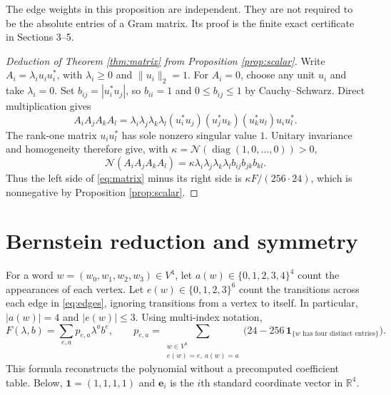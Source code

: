 \documentclass[11pt,letterpaper]{article}
\newcommand{\N}{\mathcal N}
\newcommand{\R}{\mathbb R}
\newcommand{\one}{\boldsymbol{1}}
\begin{document}
The edge weights in this proposition are independent. They are not required to be the absolute entries of a Gram matrix. Its proof is the finite exact certificate in Sections 3--5.

\begin{proof}[Deduction of Theorem \ref{thm:matrix} from Proposition \ref{prop:scalar}]
Write $A_i=\lambda_i u_i u_i^*$, with $\lambda_i\ge0$ and $\|u_i\|_2=1$. For $A_i=0$, choose any unit $u_i$ and take $\lambda_i=0$. Set $b_{ij}=|u_i^*u_j|$, so $b_{ii}=1$ and $0\le b_{ij}\le1$ by Cauchy--Schwarz. Direct multiplication gives
\[
A_iA_jA_kA_l=\lambda_i\lambda_j\lambda_k\lambda_l
 (u_i^*u_j)(u_j^*u_k)(u_k^*u_l)u_i u_l^*.
\]
The rank-one matrix $u_i u_l^*$ has sole nonzero singular value $1$. Unitary invariance and homogeneity therefore give, with $\kappa=\N(\operatorname{diag}(1,0,\ldots,0))>0$,
\begin{equation}\label{eq:reduction}
\N(A_iA_jA_kA_l)=\kappa\lambda_i\lambda_j\lambda_k\lambda_l b_{ij}b_{jk}b_{kl}.
\end{equation}
Thus the left side of \eqref{eq:matrix} minus its right side is $\kappa F/(256\cdot24)$, which is nonnegative by Proposition \ref{prop:scalar}.
\end{proof}

\section{Bernstein reduction and symmetry}
For a word $w=(w_0,w_1,w_2,w_3)\in V^4$, let $a(w)\in\{0,1,2,3,4\}^4$ count the appearances of each vertex. Let $e(w)\in\{0,1,2,3\}^6$ count the transitions across each edge in \eqref{eq:edges}, ignoring transitions from a vertex to itself. In particular, $|a(w)|=4$ and $|e(w)|\le3$. Using multi-index notation,
\begin{equation}\label{eq:power}
F(\lambda,b)=\sum_{e,a}p_{e,a}\lambda^a b^e,\qquad
p_{e,a}=\sum_{\substack{w\in V^4\\e(w)=e,\ a(w)=a}}
\bigl(24-256\,\mathbf1_{\{w\text{ has four distinct entries}\}}\bigr).
\end{equation}
This formula reconstructs the polynomial without a precomputed coefficient table. Below, $\one=(1,1,1,1)$ and $\mathbf e_i$ is the $i$th standard coordinate vector in $\R^4$.
\end{document}
